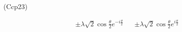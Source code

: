 \begin{tiny}(Ccp23)\end{tiny}
\begin{align*}
 \pm \lambda \sqrt{2}\cos\frac{\theta}{2}e^{-i\frac{\theta}{2}}
& &
 \pm \lambda \sqrt{2}\cos\frac{\theta}{2}e^{i\frac{\theta}{2}}
\end{align*}
